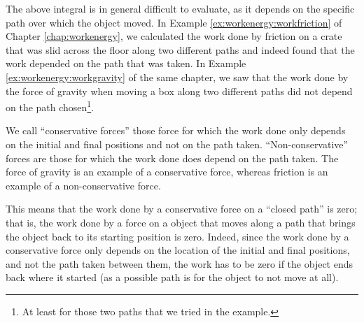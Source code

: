The above integral is in general difficult to evaluate, as it depends on the specific path over which the object moved. In Example \ref{ex:workenergy:workfriction} of Chapter \ref{chap:workenergy}, we calculated the work done by friction on a crate that was slid across the floor along two different paths and indeed found that the work depended on the path that was taken. In Example \ref{ex:workenergy:workgravity} of the same chapter, we saw that the work done by the force of gravity when moving a box along two different paths did not depend on the path chosen\footnote{At least for those two paths that we tried in the example.}.

We call ``conservative forces'' those force for which the work done only depends on the initial and final positions and not on the path taken. ``Non-conservative'' forces are those for which the work done does depend on the path taken. The force of gravity is an example of a conservative force, whereas friction is an example of a non-conservative force.

This means that the work done by a conservative force on a ``closed path'' is zero; that is, the work done by a force on a object that moves along a path that brings the object back to its starting position is zero. Indeed, since the work done by a conservative force only depends on the location of the initial and final positions, and not the path taken between them, the work has to be zero if the object ends back where it started (as a possible path is for the object to not move at all).

